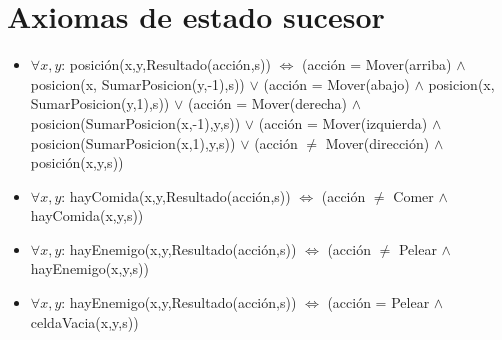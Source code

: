 \section{Axiomas de estado sucesor}

\begin{itemize}

\item $\forall x,y$: posición(x,y,Resultado(acción,s)) $\Leftrightarrow$
\newline (acción = Mover(arriba) $\land$ posicion(x, SumarPosicion(y,-1),s))
\newline $\lor$
\newline (acción = Mover(abajo) $\land$ posicion(x, SumarPosicion(y,1),s))
\newline $\lor$
\newline (acción = Mover(derecha) $\land$ posicion(SumarPosicion(x,-1),y,s))
\newline $\lor$
\newline (acción = Mover(izquierda) $\land$ posicion(SumarPosicion(x,1),y,s))
\newline $\lor$
\newline (acción $\ne$ Mover(dirección) $\land$ posición(x,y,s))

\item $\forall x,y$: hayComida(x,y,Resultado(acción,s)) $\Leftrightarrow$
\newline (acción $\ne$ Comer $\land$ hayComida(x,y,s))

\item $\forall x,y$: hayEnemigo(x,y,Resultado(acción,s)) $\Leftrightarrow$
\newline (acción $\ne$ Pelear $\land$ hayEnemigo(x,y,s))

\item $\forall x,y$: hayEnemigo(x,y,Resultado(acción,s)) $\Leftrightarrow$
\newline (acción = Pelear $\land$ celdaVacia(x,y,s))

\end{itemize}


